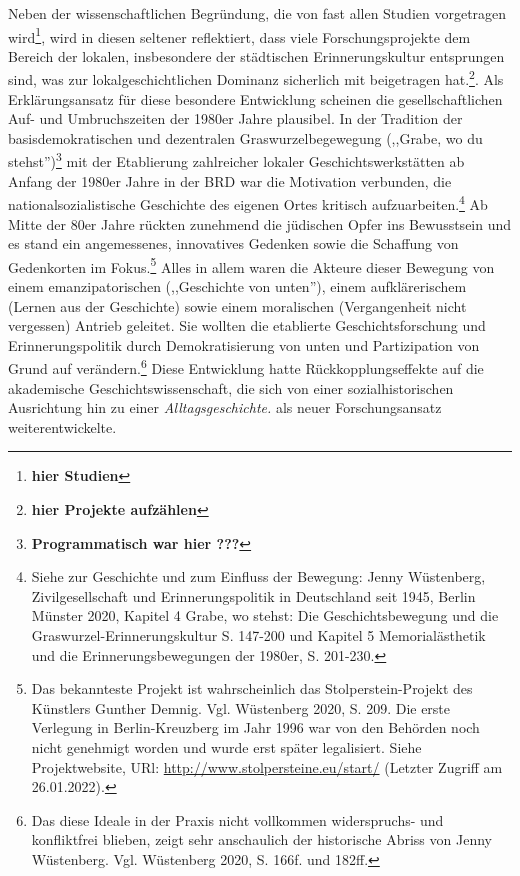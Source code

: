 Neben der wissenschaftlichen Begründung, die von fast allen Studien vorgetragen wird\footnote{\textbf{hier Studien}}, wird in diesen seltener reflektiert, dass viele Forschungsprojekte dem Bereich der lokalen, insbesondere der städtischen Erinnerungskultur entsprungen sind, was zur lokalgeschichtlichen Dominanz sicherlich mit beigetragen hat.\footnote{\textbf{hier Projekte aufzählen}}. Als Erklärungsansatz für diese besondere Entwicklung scheinen die gesellschaftlichen Auf- und Umbruchszeiten der 1980er Jahre plausibel. In der Tradition der basisdemokratischen und dezentralen Graswurzelbegewegung (,,Grabe, wo du stehst'')\footnote{\textbf{Programmatisch war hier ???}} mit der Etablierung zahlreicher lokaler Geschichtswerkstätten ab Anfang der 1980er Jahre in der BRD war die Motivation verbunden, die nationalsozialistische Geschichte des eigenen Ortes kritisch aufzuarbeiten.\footnote{Siehe zur Geschichte und zum Einfluss der Bewegung: Jenny Wüstenberg, Zivilgesellschaft und Erinnerungspolitik in Deutschland seit 1945, Berlin Münster 2020, Kapitel 4 Grabe, wo stehst: Die Geschichtsbewegung und die Graswurzel-Erinnerungskultur S. 147-200 und Kapitel 5 Memorialästhetik und die Erinnerungsbewegungen der 1980er, S. 201-230.} Ab Mitte der 80er Jahre rückten zunehmend die jüdischen Opfer ins Bewusstsein und es stand ein angemessenes, innovatives Gedenken sowie die Schaffung von Gedenkorten im Fokus.\footnote{Das bekannteste Projekt ist wahrscheinlich das Stolperstein-Projekt des Künstlers Gunther Demnig. Vgl. Wüstenberg 2020, S. 209. Die erste Verlegung in Berlin-Kreuzberg im Jahr 1996 war von den Behörden noch nicht genehmigt worden und wurde erst später legalisiert. Siehe Projektwebsite, URl: \url{http://www.stolpersteine.eu/start/} (Letzter Zugriff am 26.01.2022).} Alles in allem waren die Akteure dieser Bewegung von einem emanzipatorischen (,,Geschichte von unten''), einem aufklärerischem (Lernen aus der Geschichte) sowie einem moralischen (Vergangenheit nicht vergessen) Antrieb geleitet. Sie wollten die etablierte Geschichtsforschung und Erinnerungspolitik durch Demokratisierung von unten und Partizipation von Grund auf verändern.\footnote{Das diese Ideale in der Praxis nicht vollkommen widerspruchs- und konfliktfrei blieben, zeigt sehr anschaulich der historische Abriss von Jenny Wüstenberg. Vgl. Wüstenberg 2020, S. 166f. und 182ff.} Diese Entwicklung hatte Rückkopplungseffekte auf die akademische Geschichtswissenschaft, die sich von einer sozialhistorischen Ausrichtung hin zu einer \textit{Alltagsgeschichte.} als neuer Forschungsansatz weiterentwickelte. 

